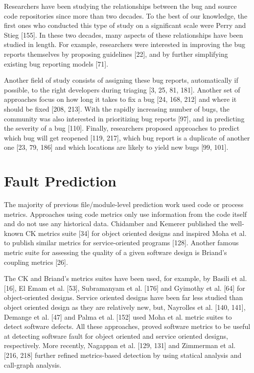 \documentclass[12pt]{report}
\begin{document}
Researchers have been studying the relationships between the bug and
source code repositories since more than two decades. To the best of our
knowledge, the first ones who conducted this type of study on a
significant scale were Perry and Stieg {[}155{]}. In these two decades,
many aspects of these relationships have been studied in length. For
example, researchers were interested in improving the bug reports
themselves by proposing guidelines {[}22{]}, and by further simplifying
existing bug reporting models {[}71{]}.

Another field of study consists of assigning these bug reports,
automatically if possible, to the right developers during triaging {[}3,
25, 81, 181{]}. Another set of approaches focus on how long it takes to
fix a bug {[}24, 168, 212{]} and where it should be fixed {[}208,
213{]}. With the rapidly increasing number of bugs, the community was
also interested in prioritizing bug reports {[}97{]}, and in predicting
the severity of a bug {[}110{]}. Finally, researchers proposed
approaches to predict which bug will get reopened {[}119, 217{]}, which
bug report is a duplicate of another one {[}23, 79, 186{]} and which
locations are likely to yield new bugs {[}99, 101{]}.

\section{Fault Prediction}\label{fault-prediction}

The majority of previous file/module-level prediction work used code or
process metrics. Approaches using code metrics only use information from
the code itself and do not use any historical data. Chidamber and
Kemerer published the well-known CK metrics suite {[}34{]} for object
oriented designs and inspired Moha et al. to publish similar metrics for
service-oriented programs {[}128{]}. Another famous metric suite for
assessing the quality of a given software design is Briand's coupling
metrics {[}26{]}.

The CK and Briand's metrics suites have been used, for example, by
Basili et al. {[}16{]}, El Emam et al. {[}53{]}, Subramanyam et al.
{[}176{]} and Gyimothy et al. {[}64{]} for object-oriented designs.
Service oriented designs have been far less studied than object oriented
design as they are relatively new, but, Nayrolles et al. {[}140, 141{]},
Demange et al. {[}47{]} and Palma et al. {[}152{]} used Moha et al.
metric suites to detect software defects. All these approaches, proved
software metrics to be useful at detecting software fault for object
oriented and service oriented designs, respectively. More recently,
Nagappan et al. {[}129, 131{]} and Zimmerman et al. {[}216, 218{]}
further refined metrics-based detection by using statical analysis and
call-graph analysis.
\end{document}

